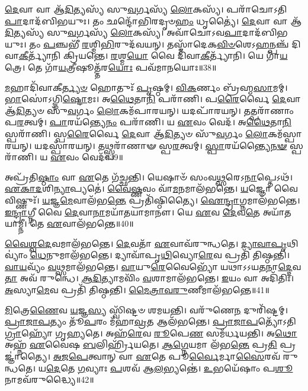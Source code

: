 \-\ul{𑌦𑍇}\-𑌵𑌾 𑌵𑌾 𑌆᳴\-\ul{𑌦𑌿}\-𑌤𑍍𑌯𑌸𑍍𑌯᳴ 𑌸𑍁\-\ul{𑌵}\-𑌰𑍍𑌗𑌸𑍍𑌯᳴ \ul{𑌲𑍋}\-𑌕𑌸𑍍𑌯᳴।
𑌪𑌰𑌾᳴𑌚𑍋\-𑌽𑌤𑌿\-\ul{𑌪𑌾}\-𑌦𑌾\-𑌦᳴𑌬𑌿𑌭𑌯𑍁𑌃।
𑌤𑌂 𑌛𑌨𑍍𑌦𑍋᳴𑌭𑌿𑌰𑌦𑍃𑍞\-\ul{𑌹𑌂} 𑌧𑍃𑌤𑍍𑌯𑍈॑।
\-\ul{𑌦𑍇}\-𑌵𑌾 𑌵𑌾 𑌆᳴\-\ul{𑌦𑌿}\-𑌤𑍍𑌯𑌸𑍍𑌯᳴ 𑌸𑍁\-\ul{𑌵}\-𑌰𑍍𑌗𑌸𑍍𑌯᳴ \ul{𑌲𑍋}\-𑌕𑌸𑍍𑌯᳴।
𑌅𑌵𑌾᳴𑌚𑍋\-𑌽𑌵\-\ul{𑌪𑌾}\-𑌦𑌾𑌦᳴𑌬𑌿𑌭𑌯𑍁𑌃।
𑌤𑌂 \ul{𑌪}\-𑌞𑍍𑌚𑌭𑍀᳴ \ul{𑌰}\-𑌶𑍍𑌮𑌿\-\ul{𑌭𑌿}\-𑌰𑍁𑌦᳴𑌵𑌯𑌨𑍍।
𑌤𑌸𑍍𑌮𑌾᳴𑌦𑍇𑌕\-\ul{𑌵𑌿}\-\-\ul{𑍞}\-𑌶𑍇\-𑌽\-\ul{𑌹}\-𑌨𑍍𑌪𑌞𑍍𑌚᳴ 𑌦𑌿𑌵𑌾\-\ul{𑌕𑍀}\-𑌰𑍍𑌤𑍍𑌯𑌾᳴𑌨𑌿 𑌕𑍍𑌰𑌿𑌯𑌨𑍍𑌤𑍇।
\-\ul{𑌰}\-𑌶𑍍𑌮\-\ul{𑌯𑍋} 𑌵𑍈 𑌦𑌿᳴𑌵𑌾\-\ul{𑌕𑍀}\-𑌰𑍍𑌤𑍍𑌯𑌾᳴𑌨𑌿।
𑌯𑍇 𑌗𑌾᳴\-\ul{𑌯}\-𑌤𑍍𑌰𑍇।
𑌤𑍇 𑌗𑌾᳴\-\ul{𑌯}\-𑌤𑍍𑌰𑍀𑌷𑍂𑌤𑍍𑌤᳴𑌰\-\ul{𑌯𑍋𑌃} 𑌪𑌵᳴𑌮𑌾𑌨𑌯𑍋𑌃॥38॥

\-\ul{𑌮}\-𑌹𑌾𑌦𑌿᳴𑌵𑌾𑌕𑍀\-\ul{𑌰𑍍𑌤𑍍𑌯}\-\-\ul{𑍞} 𑌹𑍋𑌤𑍁𑌃᳴ \ul{𑌪𑍃}\-𑌷𑍍𑌠𑌮𑍍।
\-\ul{𑌵𑌿}\-\-\ul{𑌕}\-𑌰𑍍𑌣𑌂 𑌬𑍍𑌰᳴𑌹𑍍𑌮\-\ul{𑌸𑌾}\-𑌮𑌮𑍍।
\-\ul{𑌭𑌾}\-𑌸𑍋॑\-𑌽𑌗𑍍𑌨𑌿\-\ul{𑌷𑍍𑌟𑍋}\-𑌮𑌃।
𑌅\-\ul{𑌥𑍈}\-𑌤𑌾\-\ul{𑌨𑌿} 𑌪𑌰𑌾᳴𑌣𑌿।
𑌪\-\ul{𑌰𑍈}\-𑌰𑍍𑌵𑍈 \ul{𑌦𑍇}\-𑌵𑌾 𑌆᳴\-\ul{𑌦𑌿}\-𑌤𑍍𑌯𑍞 𑌸𑍁᳴\-\ul{𑌵}\-𑌰𑍍𑌗𑌂 \ul{𑌲𑍋}\-𑌕𑌮᳴𑌪𑌾𑌰𑌯𑌨𑍍।
𑌯𑌦𑌪𑌾᳴𑌰𑌯𑌨𑍍।
𑌤𑌤𑍍𑌪𑌰𑌾᳴𑌣𑌾𑌂 𑌪\-\ul{𑌰}\-𑌤𑍍𑌵𑌮𑍍।
\-\ul{𑌪𑌾}\-𑌰𑌯᳴𑌨𑍍𑌤𑍍𑌯𑍇\-\ul{𑌨𑌂} 𑌪𑌰𑌾᳴𑌣𑌿।
𑌯 \ul{𑌏}\-𑌵𑌂 𑌵𑍇𑌦᳴।
𑌅\-\ul{𑌥𑍈}\-𑌤𑌾\-\ul{𑌨𑌿} 𑌸𑍍𑌪𑌰𑌾᳴𑌣𑌿।
𑌸𑍍𑌪\-\ul{𑌰𑍈}\-𑌰𑍍𑌵𑍈 \ul{𑌦𑍇}\-𑌵𑌾 𑌆᳴\-\ul{𑌦𑌿}\-𑌤𑍍𑌯𑍞 𑌸𑍁᳴\-\ul{𑌵}\-𑌰𑍍𑌗𑌂 \ul{𑌲𑍋}\-𑌕𑌮᳴𑌸𑍍𑌪𑌾𑌰𑌯𑌨𑍍।
𑌯𑌦𑌸𑍍𑌪𑌾᳴𑌰𑌯𑌨𑍍।
𑌤𑌥𑍍𑌸𑍍𑌪𑌰𑌾᳴𑌣𑌾𑍟 𑌸𑍍𑌪\-\ul{𑌰}\-𑌤𑍍𑌵𑌮𑍍।
\-\ul{𑌸𑍍𑌪𑌾}\-𑌰𑌯᳴𑌨𑍍𑌤𑍍𑌯𑍈\-\ul{𑌨}\-\-\ul{𑍟} 𑌸𑍍𑌪𑌰𑌾᳴𑌣𑌿।
𑌯 \ul{𑌏}\-𑌵𑌂 𑌵𑍇𑌦᳴॥39॥\anuvakamend[\-\ul{𑌏}\-\-\ul{𑌤𑌿} 𑌪𑌵᳴𑌮𑌾𑌨\-\ul{𑌯𑍋𑌃} 𑌸𑍍𑌪𑌰𑌾᳴\-\ul{𑌣𑌿} 𑌪𑌞𑍍𑌚᳴ 𑌚]

𑌅𑌪𑍍𑌰᳴𑌤𑌿\-\ul{𑌷𑍍𑌠𑌾𑌂} 𑌵𑌾 \ul{𑌏}\-𑌤𑍇 𑌗᳴𑌚𑍍𑌛𑌨𑍍𑌤𑌿।
𑌯𑍇𑌷𑌾𑍞᳴ 𑌸𑌂𑌵\-\ul{𑌥𑍍𑌸}\-𑌰𑍇\-𑌽\-\ul{𑌨𑌾}\-𑌪𑍍𑌤𑍇𑌽𑌥᳴।
\-\ul{𑌏}\-\-\ul{𑌕𑌾}\-\-\ul{𑌦}\-𑌶𑌿\-\ul{𑌨𑍍𑌯𑌾}\-𑌪𑍍𑌯𑌤𑍇॑।
\-\ul{𑌵𑍈}\-\-\ul{𑌷𑍍𑌣}\-𑌵𑌂 𑌵𑌾᳴\-\ul{𑌮}\-𑌨𑌮𑌾𑌲᳴𑌭𑌨𑍍𑌤𑍇।
\-\ul{𑌯}\-𑌜𑍍𑌞𑍋 𑌵𑍈 𑌵𑌿𑌷𑍍𑌣𑍁𑌃᳴।
\-\ul{𑌯}\-𑌜𑍍𑌞\-\ul{𑌮𑍇}\-𑌵𑌾𑌲᳴𑌭\-\ul{𑌨𑍍𑌤𑍇} 𑌪𑍍𑌰𑌤𑌿᳴\-𑌷𑍍𑌠𑌿𑌤𑍍𑌯𑍈।
\-\ul{𑌐}\-\-\ul{𑌨𑍍𑌦𑍍𑌰𑌾}\-𑌗𑍍𑌨𑌮𑌾𑌲᳴𑌭𑌨𑍍𑌤𑍇।
\-\ul{𑌇}\-\-\ul{𑌨𑍍𑌦𑍍𑌰𑌾}\-𑌗𑍍𑌨𑍀 𑌵𑍈 \ul{𑌦𑍇}\-𑌵𑌾\-\ul{𑌨𑌾}\-𑌮𑌯𑌾᳴𑌤𑌯𑌾𑌮𑌾𑌨𑍗।
𑌯𑍇 \ul{𑌏}\-𑌵 \ul{𑌦𑍇}\-𑌵\-\ul{𑌤𑍇} 𑌅𑌯𑌾᳴𑌤𑌯𑌾𑌮𑍍𑌨𑍀।
𑌤𑍇 \ul{𑌏}\-𑌵𑌾𑌲᳴𑌭𑌨𑍍𑌤𑍇॥40॥

\-\ul{𑌵𑍈}\-\-\ul{𑌶𑍍𑌵}\-\-\ul{𑌦𑍇}\-𑌵𑌮𑌾𑌲᳴𑌭𑌨𑍍𑌤𑍇।
\-\ul{𑌦𑍇}\-𑌵𑌤𑌾᳴ \ul{𑌏}\-𑌵𑌾𑌵᳴𑌰𑍁𑌨𑍍𑌧𑌤𑍇।
\-\ul{𑌦𑍍𑌯𑌾}\-\-\ul{𑌵𑌾}\-\-\ul{𑌪𑍃}\-𑌥𑌿𑌵𑍍𑌯𑌾𑌂॑ \ul{𑌧𑍇}\-𑌨𑍁𑌮𑌾𑌲᳴𑌭𑌨𑍍𑌤𑍇।
𑌦𑍍𑌯𑌾𑌵𑌾᳴𑌪𑍃\-\ul{𑌥𑌿}\-𑌵𑍍𑌯𑍋\-\ul{𑌰𑍇}\-𑌵 𑌪𑍍𑌰𑌤𑌿᳴ 𑌤𑌿𑌷𑍍𑌠𑌨𑍍𑌤𑌿।
\-\ul{𑌵𑌾}\-\-\ul{𑌯}\-𑌵𑍍𑌯𑌂᳴ \ul{𑌵}\-𑌥𑍍𑌸𑌮𑌾𑌲᳴𑌭𑌨𑍍𑌤𑍇।
\-\ul{𑌵𑌾}\-𑌯𑍁\-\ul{𑌰𑍇}\-𑌵𑍈𑌭𑍍𑌯𑍋᳴ 𑌯𑌥𑌾\-𑌽𑌽𑌯\-\ul{𑌤}\-𑌨𑌾\-\ul{𑌦𑍍𑌦𑍇}\-𑌵\-\ul{𑌤𑌾} 𑌅𑌵᳴ 𑌰𑍁𑌨𑍍𑌧𑍇।
\-\ul{𑌆}\-\-\ul{𑌦𑌿}\-𑌤𑍍𑌯𑌾𑌮𑌵𑌿𑌂᳴ \ul{𑌵}\-𑌶𑌾𑌮𑌾𑌲᳴𑌭𑌨𑍍𑌤𑍇।
\-\ul{𑌇}\-𑌯𑌂 𑌵𑌾 𑌅𑌦𑌿᳴𑌤𑌿𑌃।
\-\ul{𑌅}\-𑌸𑍍𑌯𑌾\-\ul{𑌮𑍇}\-𑌵 𑌪𑍍𑌰𑌤𑌿᳴ 𑌤𑌿𑌷𑍍𑌠𑌨𑍍𑌤𑌿।
\-\ul{𑌮𑍈}\-\-\ul{𑌤𑍍𑌰𑌾}\-\-\ul{𑌵}\-\-\ul{𑌰𑍁}\-𑌣𑍀𑌮𑌾𑌲᳴𑌭𑌨𑍍𑌤𑍇॥41॥

\-\ul{𑌮𑌿}\-𑌤𑍍𑌰𑍇\-\ul{𑌣𑍈}\-𑌵 \ul{𑌯}\-𑌜𑍍𑌞\-\ul{𑌸𑍍𑌯} 𑌸𑍍𑌵𑌿᳴𑌷𑍍𑌟𑍞 𑌶𑌮𑌯𑌨𑍍𑌤𑌿।
𑌵𑌰𑍁᳴𑌣𑍇\-\ul{𑌨} 𑌦𑍁𑌰𑌿᳴𑌷𑍍𑌟𑌮𑍍।
\-\ul{𑌪𑍍𑌰𑌾}\-\-\ul{𑌜𑌾}\-\-\ul{𑌪}\-𑌤𑍍𑌯𑌂 𑌤𑍂᳴\-\ul{𑌪}\-𑌰𑌂 𑌮᳴𑌹𑌾\-\ul{𑌵𑍍𑌰}\-𑌤 𑌆𑌲᳴𑌭𑌨𑍍𑌤𑍇।
\-\ul{𑌪𑍍𑌰𑌾}\-\-\ul{𑌜𑌾}\-\-\ul{𑌪}\-𑌤𑍍𑌯𑍋᳴\-𑌽𑌤𑌿\-\ul{𑌗𑍍𑌰𑌾}\-𑌹𑍍𑌯𑍋᳴ 𑌗𑍃𑌹𑍍𑌯𑌤𑍇।
𑌅𑌹᳴\-\ul{𑌰𑍇}\-𑌵 \ul{𑌰𑍂}\-𑌪𑍇\-\ul{𑌣} 𑌸𑌮᳴𑌰𑍍𑌧𑌯𑌨𑍍𑌤𑌿।
𑌅\-\ul{𑌥𑍋} 𑌅𑌹𑍍𑌨᳴ \ul{𑌏}\-𑌵𑍈𑌷 \ul{𑌬}\-𑌲𑌿𑌰𑍍\mbox{}𑌹𑍍𑌰𑌿᳴𑌯𑌤𑍇।
\-\ul{𑌆}\-\-\ul{𑌗𑍍𑌨𑍇}\-𑌯𑌮𑌾 𑌲᳴𑌭\-\ul{𑌨𑍍𑌤𑍇} 𑌪𑍍𑌰\-\ul{𑌤𑌿} 𑌪𑍍𑌰𑌜𑍍𑌞𑌾॑𑌤𑍍𑌯𑍈।
\-\ul{𑌅}\-\-\ul{𑌜}\-\-\ul{𑌪𑍇}\-𑌤𑍍𑌵𑌾𑌨𑍍 𑌵𑌾 \ul{𑌏}\-𑌤𑍇 𑌪𑍂\-\ul{𑌰𑍍𑌵𑍈}\-𑌰𑍍𑌮𑌾\-\ul{𑌸𑍈}\-𑌰𑌵᳴ 𑌰𑍁𑌨𑍍𑌧𑌤𑍇।
𑌯\-\ul{𑌦𑍇}\-𑌤𑍇 \ul{𑌗}\-𑌵𑍍𑌯𑌾𑌃 \ul{𑌪}\-𑌶𑌵᳴ 𑌆\-\ul{𑌲}\-𑌭𑍍𑌯𑌨𑍍𑌤𑍇॑।
\-\ul{𑌉}\-𑌭𑌯𑍇᳴𑌷𑌾𑌂 𑌪\-\ul{𑌶𑍂}\-𑌨𑌾𑌮𑌵᳴𑌰𑍁𑌦𑍍𑌧𑍍𑌯𑍈॥42॥

